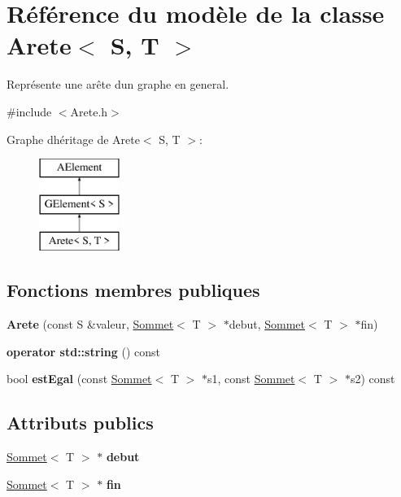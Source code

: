 \hypertarget{class_arete}{}\section{Référence du modèle de la classe Arete$<$ S, T $>$}
\label{class_arete}


Représente une arête d\textquotesingle{}un graphe en general.  




{\ttfamily \#include $<$Arete.\+h$>$}

Graphe d\textquotesingle{}héritage de Arete$<$ S, T $>$\+:\begin{figure}[H]
\begin{center}
\leavevmode
\includegraphics[height=3.000000cm]{class_arete}
\end{center}
\end{figure}
\subsection*{Fonctions membres publiques}
\begin{DoxyCompactItemize}
\item 
\mbox{\label{class_arete_a477fdd0fe1a36292114f02805e3ed56b}} 
{\bfseries Arete} (const S \&valeur, \mbox{\hyperlink{class_sommet}{Sommet}}$<$ T $>$ $\ast$debut, \mbox{\hyperlink{class_sommet}{Sommet}}$<$ T $>$ $\ast$fin)
\item 
\mbox{\label{class_arete_a22be3485e4bb9b3231205751755bc69a}} 
{\bfseries operator std\+::string} () const
\item 
\mbox{\label{class_arete_a3ad238ea344eb0fc755f224e08f7554e}} 
bool {\bfseries est\+Egal} (const \mbox{\hyperlink{class_sommet}{Sommet}}$<$ T $>$ $\ast$s1, const \mbox{\hyperlink{class_sommet}{Sommet}}$<$ T $>$ $\ast$s2) const
\end{DoxyCompactItemize}
\subsection*{Attributs publics}
\begin{DoxyCompactItemize}
\item 
\mbox{\label{class_arete_a824a8bf33360aafaf1cbb91d770b4338}} 
\mbox{\hyperlink{class_sommet}{Sommet}}$<$ T $>$ $\ast$ {\bfseries debut}
\item 
\mbox{\label{class_arete_acbe522bae2ccff518e326077c98eca78}} 
\mbox{\hyperlink{class_sommet}{Sommet}}$<$ T $>$ $\ast$ {\bfseries fin}
\end{DoxyCompactItemize}
